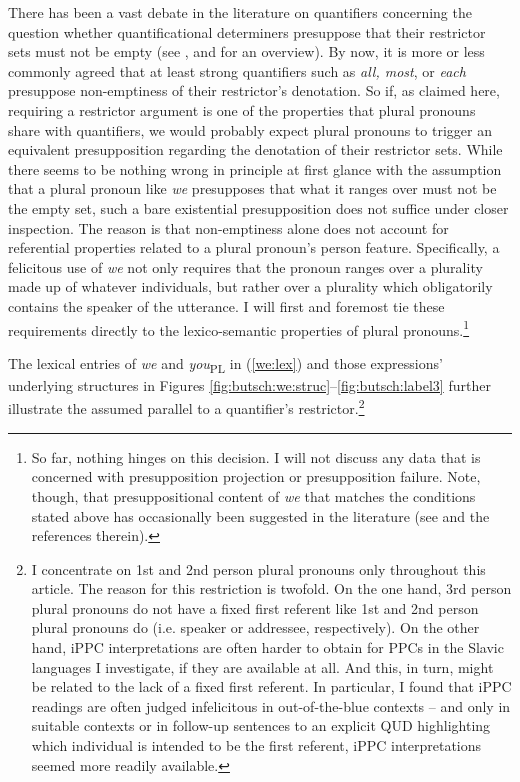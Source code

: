 \documentclass[output=paper,colorlinks,citecolor=brown]{langscibook}
\begin{document}
There has been a vast debate in the literature on quantifiers concerning the question whether quantificational determiners presuppose that their restrictor sets must not be empty (see \cite{HeimKratzer1998}, and \cite{Szabolcsi2010} for an overview). By now, it is more or less commonly agreed that at least strong quantifiers such as \textit{all, most}, or \textit{each} presuppose non-emptiness of their restrictor's denotation. So if, as claimed here, requiring a restrictor argument is one of the properties that plural pronouns share with quantifiers, we would probably expect plural pronouns to trigger an equivalent presupposition regarding the denotation of their restrictor sets. While there seems to be nothing wrong in principle at first glance with the assumption that a plural pronoun like \textit{we} presupposes that what it ranges over must not be the empty set, such a bare existential presupposition does not suffice under closer inspection. The reason is that non-emptiness alone does not account for referential properties related to a plural pronoun's person feature. Specifically, a felicitous use of \textit{we} not only requires that the pronoun ranges over a plurality made up of whatever individuals, but rather over a plurality which obligatorily contains the speaker of the utterance. I will first and foremost tie these requirements directly to the lexico-semantic properties of plural pronouns.\footnote{So far, nothing hinges on this decision. I will not discuss any data that is concerned with presupposition projection or presupposition failure. Note, though, that presuppositional content of \textit{we} that matches the conditions stated above has occasionally been suggested in the literature (see \cite{Stokke2022} and the references therein).}


The lexical entries of \textit{we} and \textit{you}\textsubscript{PL} in (\ref{we:lex}) and those expressions' underlying structures in Figures \ref{fig:butsch:we:struc}--\ref{fig:butsch:label3}  further illustrate the assumed parallel to a quantifier's restrictor.\footnote{I concentrate on 1st and 2nd person plural pronouns only throughout this article. The reason for this restriction is twofold. On the one hand, 3rd person plural pronouns do not have a fixed first referent like 1st and 2nd person plural pronouns do (i.e. speaker or addressee, respectively). On the other hand, iPPC interpretations are often harder to obtain for PPCs in the Slavic languages I investigate, if they are available at all. And this, in turn, might be related to the lack of a fixed first referent. In particular, I found that iPPC readings are often judged infelicitous in out-of-the-blue contexts -- and only in suitable contexts or in follow-up sentences to an explicit QUD highlighting which individual is intended to be the first referent, iPPC interpretations seemed more readily available.}
\end{document}
